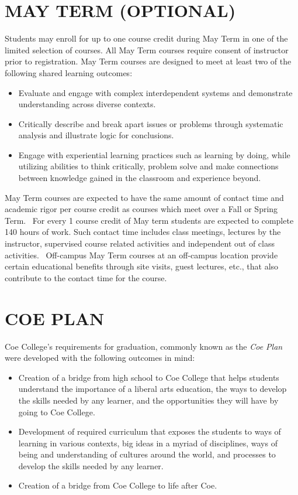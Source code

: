 \documentclass[
  letterpaper,
]{scrbook}
\providecommand{\tightlist}{%
  \setlength{\itemsep}{0pt}\setlength{\parskip}{0pt}}
\begin{document}
\chapter{MAY TERM (OPTIONAL)}\label{may-term-optional}

Students may enroll for up to one course credit during May Term in one
of the limited selection of courses. All May Term courses require
consent of instructor prior to registration. May Term courses are
designed to meet at least two of the following shared learning outcomes:

\begin{itemize}
\tightlist
\item
  Evaluate and engage with complex interdependent systems and
  demonstrate understanding across diverse contexts.
\item
  Critically describe and break apart issues or problems through
  systematic analysis and illustrate logic for conclusions.
\item
  Engage with experiential learning practices such as learning by doing,
  while utilizing abilities to think critically, problem solve and make
  connections between knowledge gained in the classroom and experience
  beyond.
\end{itemize}

May Term courses are expected to have the same amount of contact time
and academic rigor per course credit as courses which meet over a Fall
or Spring Term.~ For every 1 course credit of May term students are
expected to complete 140 hours of work. Such contact time includes class
meetings, lectures by the instructor, supervised course related
activities and independent out of class activities.~ Off-campus May Term
courses at an off-campus location provide certain educational benefits
through site visits, guest lectures, etc., that also contribute to the
contact time for the course.

\chapter{COE PLAN}\label{sec-coe-plan}

Coe College's requirements for graduation, commonly known as the
\emph{Coe Plan} were developed with the following outcomes in mind:

\begin{itemize}
\tightlist
\item
  Creation of a bridge from high school to Coe College that helps
  students understand the importance of a liberal arts education, the
  ways to develop the skills needed by any learner, and the
  opportunities they will have by going to Coe College.
\item
  Development of required curriculum that exposes the students to ways
  of learning in various contexts, big ideas in a myriad of disciplines,
  ways of being and understanding of cultures around the world, and
  processes to develop the skills needed by any learner.
\item
  Creation of a bridge from Coe College to life after Coe.
\end{itemize}
\end{document}

